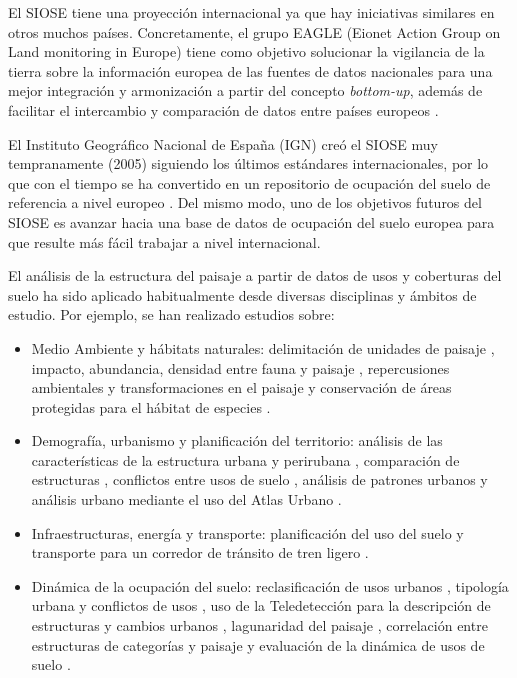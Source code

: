 El SIOSE tiene una proyección internacional ya que hay iniciativas similares en otros muchos países. Concretamente, el grupo EAGLE (Eionet Action Group on Land monitoring in Europe) tiene como objetivo solucionar la vigilancia de la tierra sobre la información europea de las fuentes de datos nacionales para una mejor integración y armonización a partir del concepto \textit{bottom-up}, además de facilitar el intercambio y comparación de datos entre países europeos \citep{Arnold2013}. 

El Instituto Geográfico Nacional de España (IGN) creó el SIOSE muy tempranamente (2005) siguiendo los últimos estándares internacionales, por lo que con el tiempo se ha convertido en un repositorio de ocupación del suelo de referencia a nivel europeo \citep{EquipoTecnicoNacionalSIOSE2015}. Del mismo modo, uno de los objetivos futuros del SIOSE es avanzar hacia una base de datos de ocupación del suelo europea para que resulte más fácil trabajar a nivel internacional.

El análisis de la estructura del paisaje a partir de datos de usos y coberturas del suelo ha sido aplicado habitualmente desde diversas disciplinas y ámbitos de estudio. Por ejemplo, se han realizado estudios sobre:

\begin{itemize}
\item Medio Ambiente y hábitats naturales: delimitación de unidades de paisaje \citep{Gine2014}, impacto, abundancia, densidad entre fauna y paisaje \citep{Hamilton2009,Hebeisen2008,Brennan2005}, repercusiones ambientales y transformaciones en el paisaje \citep{GimenezFont2010} y conservación de áreas protegidas para el hábitat de especies \citep{Lin2014}.
\item Demografía, urbanismo y planificación del territorio: análisis de las características de la estructura urbana y perirubana \citep{Aguilera2011,Jacquin2008}, comparación de estructuras \citep{Blaschke1999}, conflictos entre usos de suelo \citep{Tudor2014}, análisis de patrones urbanos \citep{Aguilera2010} y análisis urbano mediante el uso del Atlas Urbano \citep{Prastacos2017}.
\item Infraestructuras, energía y transporte: planificación del uso del suelo y transporte para un corredor de tránsito de tren ligero \citep{Soria-Lara2016}.
\item Dinámica de la ocupación del suelo: reclasificación de usos urbanos \citep{VanderKwast2011}, tipología urbana y conflictos de usos \citep{Dunk2011,Aguilera2012}, uso de la Teledetección para la descripción de estructuras y cambios urbanos \citep{Herold2002}, lagunaridad del paisaje \citep{Roces-Diaz2014}, correlación entre estructuras de categorías y paisaje \citep{Liu2016} y evaluación de la dinámica de usos de suelo \citep{Rodriguez-Rodriguez2017}.
\end{itemize}

